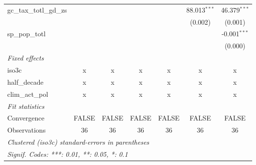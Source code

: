 \begin{tabular}{lcccccc}
   gc\_tax\_totl\_gd\_zs                               &                   &                 &                   &                   & 88.013$^{***}$    & 46.379$^{***}$\\   
                                                       &                   &                 &                   &                   & (0.002)           & (0.001)\\   
   sp\_pop\_totl                                       &                   &                 &                   &                   &                   & -0.001$^{***}$\\   
                                                       &                   &                 &                   &                   &                   & (0.000)\\   
   \emph{Fixed effects}\\
   iso3c                                               & x                 & x               & x                 & x                 & x                 & x\\  
   half\_decade                                        & x                 & x               & x                 & x                 & x                 & x\\  
   clim\_act\_pol                                      & x                 & x               & x                 & x                 & x                 & x\\  
   \midrule \emph{Fit statistics}\\
   Convergence                                         &FALSE              & FALSE           & FALSE             & FALSE             & FALSE             & FALSE\\  
   Observations                                        & 36                & 36              & 36                & 36                & 36                & 36\\  
   \midrule
   \multicolumn{7}{l}{\emph{Clustered (iso3c) standard-errors in parentheses}}\\
   \multicolumn{7}{l}{\emph{Signif. Codes: ***: 0.01, **: 0.05, *: 0.1}}\\
\end{tabular}
\par\endgroup


